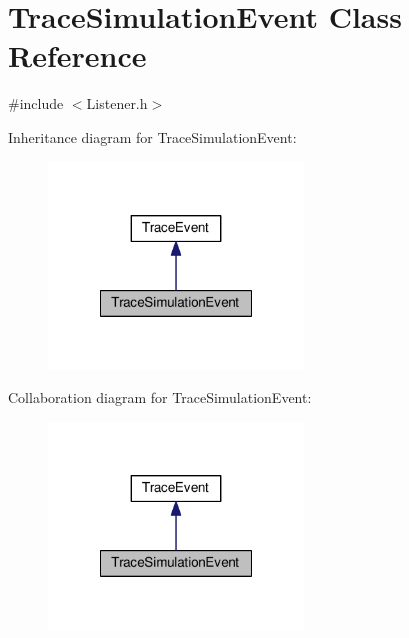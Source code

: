 \hypertarget{class_trace_simulation_event}{\section{Trace\-Simulation\-Event Class Reference}
\label{class_trace_simulation_event}
}


{\ttfamily \#include $<$Listener.\-h$>$}



Inheritance diagram for Trace\-Simulation\-Event\-:\nopagebreak
\begin{figure}[H]
\begin{center}
\leavevmode
\includegraphics[width=192pt]{class_trace_simulation_event__inherit__graph}
\end{center}
\end{figure}


Collaboration diagram for Trace\-Simulation\-Event\-:\nopagebreak
\begin{figure}[H]
\begin{center}
\leavevmode
\includegraphics[width=192pt]{class_trace_simulation_event__coll__graph}
\end{center}
\end{figure}
